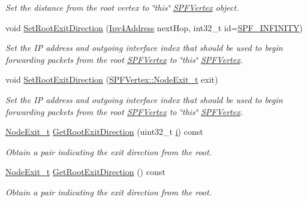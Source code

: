 \begin{DoxyCompactItemize}
\begin{DoxyCompactList}\small\item\em Set the distance from the root vertex to \char`\"{}this\char`\"{} \hyperlink{classns3_1_1SPFVertex}{S\+P\+F\+Vertex} object. \end{DoxyCompactList}\item 
void \hyperlink{classns3_1_1SPFVertex_a8538efb9de281a8a76bfeb7124dee3ae}{Set\+Root\+Exit\+Direction} (\hyperlink{classns3_1_1Ipv4Address}{Ipv4\+Address} next\+Hop, int32\+\_\+t id=\hyperlink{namespacens3_a769ef05d7ddcbbcb31343fa01a4d270b}{S\+P\+F\+\_\+\+I\+N\+F\+I\+N\+I\+TY})
\begin{DoxyCompactList}\small\item\em Set the IP address and outgoing interface index that should be used to begin forwarding packets from the root \hyperlink{classns3_1_1SPFVertex}{S\+P\+F\+Vertex} to \char`\"{}this\char`\"{} \hyperlink{classns3_1_1SPFVertex}{S\+P\+F\+Vertex}. \end{DoxyCompactList}\item 
void \hyperlink{classns3_1_1SPFVertex_a1946fb82f93520f20aa1325dd006efc8}{Set\+Root\+Exit\+Direction} (\hyperlink{classns3_1_1SPFVertex_a0adf6255ec0357050ef5436597b4cb32}{S\+P\+F\+Vertex\+::\+Node\+Exit\+\_\+t} exit)
\begin{DoxyCompactList}\small\item\em Set the IP address and outgoing interface index that should be used to begin forwarding packets from the root \hyperlink{classns3_1_1SPFVertex}{S\+P\+F\+Vertex} to \char`\"{}this\char`\"{} \hyperlink{classns3_1_1SPFVertex}{S\+P\+F\+Vertex}. \end{DoxyCompactList}\item 
\hyperlink{classns3_1_1SPFVertex_a0adf6255ec0357050ef5436597b4cb32}{Node\+Exit\+\_\+t} \hyperlink{classns3_1_1SPFVertex_a4287596177d5af62997d1f1dea8648ac}{Get\+Root\+Exit\+Direction} (uint32\+\_\+t \hyperlink{lte__uplink__power__control_8m_a6f6ccfcf58b31cb6412107d9d5281426}{i}) const 
\begin{DoxyCompactList}\small\item\em Obtain a pair indicating the exit direction from the root. \end{DoxyCompactList}\item 
\hyperlink{classns3_1_1SPFVertex_a0adf6255ec0357050ef5436597b4cb32}{Node\+Exit\+\_\+t} \hyperlink{classns3_1_1SPFVertex_aff97d583c2ec7071ee903f23ec669ced}{Get\+Root\+Exit\+Direction} () const 
\begin{DoxyCompactList}\small\item\em Obtain a pair indicating the exit direction from the root. \end{DoxyCompactList}\item 

\end{DoxyCompactItemize}

